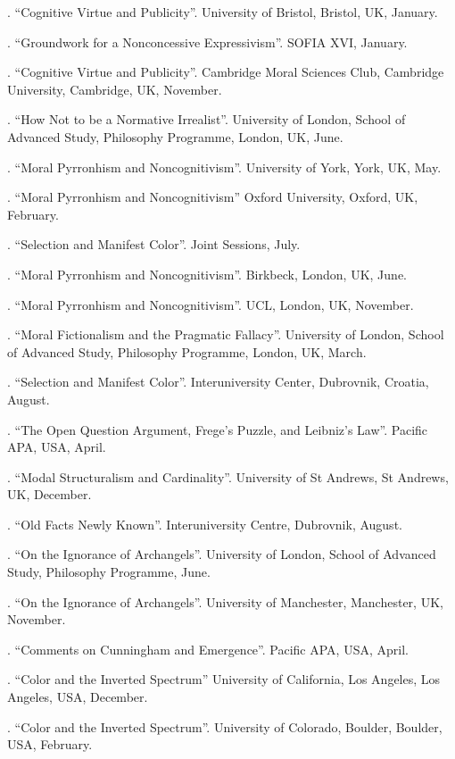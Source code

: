 \documentclass[11pt]{article}
\begin{document}
. ``Cognitive Virtue and Publicity''. University of Bristol, Bristol, UK, January.

.  ``Groundwork for a Nonconcessive Expressivism''. SOFIA XVI, January.

. ``Cognitive Virtue and Publicity''. Cambridge Moral Sciences Club, Cambridge University, Cambridge, UK, November.

. ``How Not to be a Normative Irrealist''. University of London, School of Advanced Study, Philosophy Programme, London, UK, June.

. ``Moral Pyrronhism and Noncognitivism''. University of York, York, UK, May.

. ``Moral Pyrronhism and Noncognitivism'' Oxford University, Oxford, UK, February.

. ``Selection and Manifest Color''. Joint Sessions, July.

. ``Moral Pyrronhism and Noncognitivism''. Birkbeck, London, UK, June.

. ``Moral Pyrronhism and Noncognitivism''. UCL, London, UK, November.

. ``Moral Fictionalism and the Pragmatic Fallacy''. University of London, School of Advanced Study, Philosophy Programme, London, UK, March.

. ``Selection and Manifest Color''. Interuniversity Center, Dubrovnik, Croatia, August.

. ``The Open Question Argument, Frege's Puzzle, and Leibniz's Law''. Pacific APA, USA, April.

. ``Modal Structuralism and Cardinality''.  University of St Andrews, St Andrews, UK, December.

. ``Old Facts Newly Known''. Interuniversity Centre, Dubrovnik, August.

. ``On the Ignorance of Archangels''. University of London, School of Advanced Study, Philosophy Programme, June.

. ``On the Ignorance of Archangels''. University of Manchester, Manchester, UK, November.

. ``Comments on Cunningham and Emergence''. Pacific APA, USA, April.

. ``Color and the Inverted Spectrum'' University of California, Los Angeles, Los Angeles, USA, December.

. ``Color and the Inverted Spectrum''. University of Colorado, Boulder, Boulder, USA, February.
\end{document}
